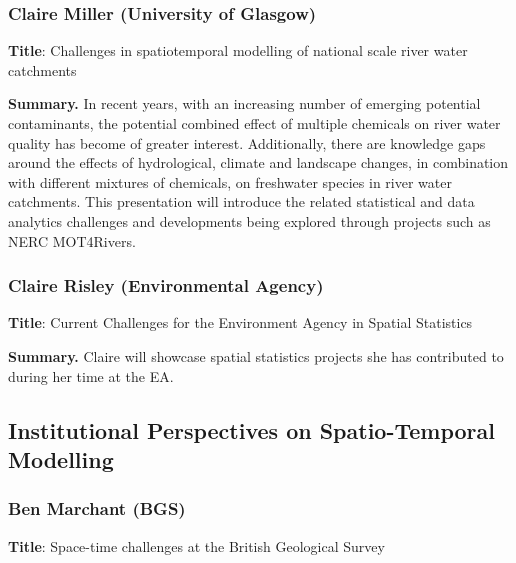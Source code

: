 \documentclass[
  11pt,
  letterpaper,
  DIV=11,
  numbers=noendperiod]{scrartcl}
\begin{document}
\subsubsection[\textbf{Claire Miller} (University of Glasgow) \\Challenges in spatiotemporal modelling of national scale river water catchments]{Claire Miller (University of Glasgow)}

\textbf{Title}: Challenges in spatiotemporal modelling of national scale
river water catchments

\textbf{Summary.} In recent years, with an increasing number of emerging
potential contaminants, the potential combined effect of multiple
chemicals on river water quality has become of greater interest.
Additionally, there are knowledge gaps around the effects of
hydrological, climate and landscape changes, in combination with
different mixtures of chemicals, on freshwater species in river water
catchments. This presentation will introduce the related statistical and
data analytics challenges and developments being explored through
projects such as NERC MOT4Rivers.

\subsubsection[\textbf{Claire Risley} (Environmental Agency) \\Current Challenges for the Environment Agency in Spatial Statistics]{Claire Risley (Environmental Agency)}

\textbf{Title}: Current Challenges for the Environment Agency in Spatial
Statistics

\textbf{Summary.} Claire will showcase spatial statistics projects she
has contributed to during her time at the EA.

\subsection{Institutional Perspectives on Spatio-Temporal
Modelling}\label{institutional-perspectives-on-spatio-temporal-modelling}

\subsubsection[\textbf{Ben Marchant} (BGS) \\Space-time challenges at the British Geological Survey]{Ben Marchant (BGS)}

\textbf{Title}: Space-time challenges at the British Geological Survey
\end{document}
